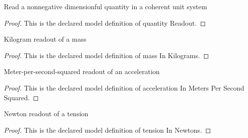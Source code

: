 \begin{definition}
  \label{def:physics:phyx-mini-0292:phyxminiproblems-problemphyxmini0292-quantityreadout}
  Read a nonnegative dimensionful quantity in a coherent unit system
\end{definition}
\begin{proof}
  This is the declared model definition of quantity Readout.
\end{proof}
\begin{definition}
  \label{def:physics:phyx-mini-0292:phyxminiproblems-problemphyxmini0292-massinkilograms}
  Kilogram readout of a mass
\end{definition}
\begin{proof}
  This is the declared model definition of mass In Kilograms.
\end{proof}
\begin{definition}
  \label{def:physics:phyx-mini-0292:phyxminiproblems-problemphyxmini0292-accelerationinmeterspersecondsquared}
  Meter-per-second-squared readout of an acceleration
\end{definition}
\begin{proof}
  This is the declared model definition of acceleration In Meters Per Second Squared.
\end{proof}
\begin{definition}
  \label{def:physics:phyx-mini-0292:phyxminiproblems-problemphyxmini0292-tensioninnewtons}
  Newton readout of a tension
\end{definition}
\begin{proof}
  This is the declared model definition of tension In Newtons.
\end{proof}
